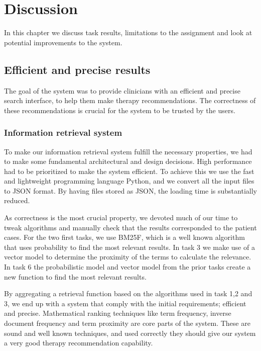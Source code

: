 \chapter{Discussion}
\label{cha:discussion}
In this chapter we discuss task results, limitations to the assignment and look at potential improvements to the system. 


\section{Efficient and precise results}
The goal of the system was to provide clinicians with an efficient and precise search interface, to help them make therapy recommendations. The correctness of these recommendations is crucial for the system to be trusted by the users.

\subsection{Information retrieval system}
To make our information retrieval system fulfill the necessary properties, we had to make some fundamental architectural and design decisions.
High performance had to be prioritized to make the system efficient. To achieve this we use the fast and lightweight programming language Python, and we convert all the input files to JSON format. By having files stored as JSON, the loading time is substantially reduced.

As correctness is the most crucial property, we devoted much of our time to tweak algorithms and manually check that the results corresponded to the patient cases. For the two first tasks, we use BM25F, which is a well known algorithm that uses probability to find the most relevant results. In task 3 we make use of a vector model to determine the proximity of the terms to calculate the relevance. In task 6 the probabilistic model and vector model from the prior tasks create a new function to find the most relevant results.    

By aggregating a retrieval function based on the algorithms used in task 1,2 and 3, we end up with a system that comply with the initial requirements; efficient and precise. Mathematical ranking techniques like term frequency, inverse document frequency and term proximity are core parts of the system. These are sound and well known techniques, and used correctly they should give our system a very good therapy recommendation capability.


